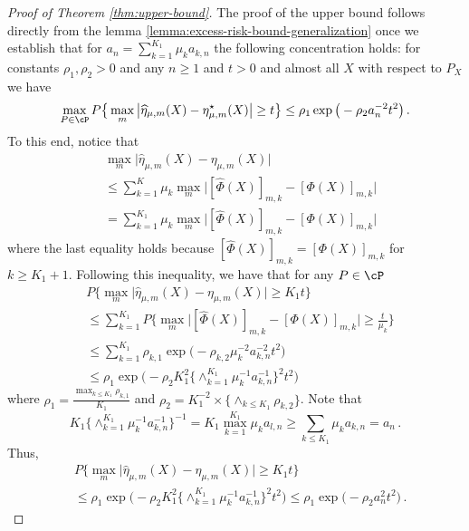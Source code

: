 

\begin{proof}[Proof of Theorem \ref{thm:upper-bound}]

    The proof of the upper bound follows directly from the lemma \ref{lemma:excess-risk-bound-generalization} once we establish that for $a_n = \sum_{k = 1}^{K_1}\mu_k a_{k, n}$ the following concentration holds: 
    for constants $\rho_{ 1}, \rho_{ 2} > 0$ and any $n \ge 1$ and $t > 0$ and almost all $X$ with respect to $P_X$ we have 
    \begin{equation} \label{eq:concentration-phi-gen}
        \max_{P\in \cP} P \big \{ \max_m \big |\widehat \eta_{\mu, m} (X) - \eta^\star_{\mu, m}  (X)\big |  \ge t\big \} \le  \rho_1 \exp\big (- \rho_2 a_{ n}^{-2} t^2 \big )\,.   
    \end{equation} To this end, notice that 
    \[
    \begin{aligned}
        & \textstyle\max_m \big |\widehat \eta_{\mu, m} (X) - \eta_{\mu, m}  (X)\big | \\
        & \textstyle \le \sum_{k = 1}^{K} \mu_k  \max_m\big |[\widehat \Phi(X)]_{m, k} - [ \Phi(X)]_{m, k} \big| \\
        & = \textstyle \sum_{k = 1}^{K_1} \mu_k  \max_m\big |[\widehat \Phi(X)]_{m, k} - [ \Phi(X)]_{m, k} \big|
    \end{aligned}
    \] where the last equality holds because $[\widehat \Phi(X)]_{m, k} = [\Phi(X)]_{m, k}$ for $k \ge K_1+1$. Following this inequality, we have that for any $P\in \cP$ \[
    \begin{aligned}
        & \textstyle P \big \{ \max_m \big |\widehat \eta_{\mu, m} (X) - \eta_{\mu, m}  (X)\big |  \ge K_1 t\big \}\\
        & \le \textstyle \sum_{k = 1}^{K_1} P \big \{ \max_m \big |[\widehat \Phi(X)]_{m, k} - [ \Phi(X)]_{m, k} \big|  \ge \frac t{\mu_k}\big \} \\
        & \le \textstyle \sum_{k = 1}^{K_1}\rho_{k, 1} \exp\big (- \rho_{k, 2} \mu_k ^{-2}a_{ k, n}^{-2} t^2 \big )\\
        & \textstyle \le  \rho_1 \exp\big (- {\rho_{ 2}}{K_1^2} \{\wedge_{k = 1}^{K_1}\mu_k^{-1}a_{ k, n}^{-1}\}^2 t^2 \big )
    \end{aligned}
    \] where $\rho_1 = \frac{\max_{k \le K_1} \rho_{k, 1}}{K_1}$ and $\rho_2 = K_1^{-2} \times \{ \wedge_{k \le K_1} \rho_{k, 2}\} $. Note that 
    \[
    \textstyle K_1\{\wedge_{k = 1}^{K_1}\mu_k^{-1}a_{ k, n}^{-1}\}^{-1} = K_1 \max_{k = 1}^{K_1}\mu_k a_{ l, n} \ge  \sum_{k \le K_1 } \mu_k a_{ k, n} = a_n\,. 
    \] Thus, 
    \[
    \begin{aligned}
       & \textstyle P \big \{ \max_m \big |\widehat \eta_{\mu, m} (X) - \eta_{\mu, m}  (X)\big |  \ge K_1 t\big \}\\
        & \textstyle \le  \rho_1 \exp\big (- {\rho_{ 2}}{K_1^2} \{\wedge_{k = 1}^{K_1}\mu_k^{-1}a_{ k, n}^{-1}\}^2 t^2 \big ) \le \rho_1 \exp\big (- {\rho_{ 2}}a_n ^2 t^2 \big ) \,.
    \end{aligned}
    \] 

    
\end{proof}

